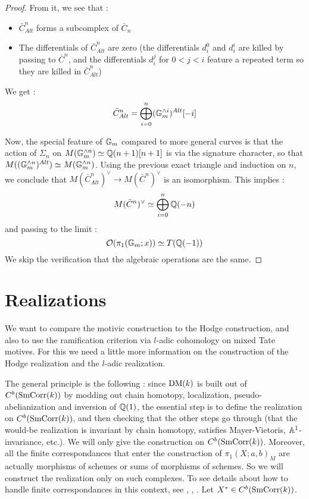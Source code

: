 \begin{proof}
From it, we see that :
\begin{itemize}
\item $\bar{C}^n_{Alt}$ forms a subcomplex of $\bar{C}_n$
\item The differentials of $\bar{C}^n_{Alt}$ are zero (the differentials $d_i^0$ and $d_i^i$ are killed by passing to $\bar{C}^n$, and the differentials $d_i^j$ for $0<j<i$ feature a repeated term so they are killed in $\bar{C}^n_{Alt}$)
\end{itemize}
We get :
\[
\bar{C}^n_{Alt}=\bigoplus_{i=0}^n(\mathbb{G}_m^{\wedge i})^{Alt}[-i]
\]

Now, the special feature of $\mathbb{G}_m$ compared to more general curves is that the action of $\Sigma_n$ on $M(\mathbb{G}_m^{\wedge n})\simeq \mathbb{Q}(n+1)[n+1]$ is via the signature character, so that $M((\mathbb{G}_m^{\wedge n})^{Alt})\simeq M(\mathbb{G}_m^{\wedge n})$.  Using the previous exact triangle and induction on $n$, we conclude that $M(\bar{C}^n_{Alt})^\vee\rightarrow M(\bar{C}^n)^\vee$ is an isomorphism. This implies :
\[
M(\bar{C}^n)^\vee\simeq \bigoplus_{i=0}^n \mathbb{Q}(-n)
\]
and passing to the limit :
\[
\mathcal{O}(\pi_1(\mathbb{G}_m;x))\simeq T(\mathbb{Q}(-1))
\]
We skip the verification that the algebraic operations are the same.
\end{proof}

\section{Realizations}

We want to compare the motivic construction to the Hodge construction, and also to use the ramification criterion via $l$-adic cohomology on mixed Tate motives. For this we need a little more information on the construction of the Hodge realization and the $l$-adic realization.

The general principle is the following : since $\mathrm{DM}(k)$ is built out of $C^b(\mathrm{SmCorr}(k))$ by modding out chain homotopy, localization, pseudo-abelianization and inversion of $\mathbb{Q}(1)$, the essential step is to define the realization on $C^b(\mathrm{SmCorr}(k))$, and then checking that the other steps go through (that the would-be realization is invariant by chain homotopy, satisfies Mayer-Vietoris, $\mathbb{A}^1$-invariance, etc.). We will only give the construction on $C^b(\mathrm{SmCorr}(k))$. Moreover, all the finite correspondances that enter the construction of $\pi_1(X;a,b)_M$ are actually morphisms of schemes or sums of morphisms of schemes. So we will construct the realization only on such complexes. To see details about how to handle finite correspondances in this context, see \cite[Paragraph 1.5]{deligne-goncharov05}, \cite{huber00-realization}, \cite{ab}. Let $X^*\in C^b(\mathrm{SmCorr}(k))$.

